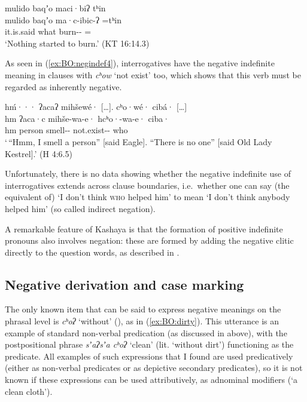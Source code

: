 \documentclass[output=paper,modfonts,nonflat,colorlinks,citecolor=brown]{langscibook}
\begin{document}
{%
\ea 
\label{ex:BO:negindef3}
\glll mulido baqʼo maci·biʔ tʰin\\
    mulido baqʼo ma·c-ibic-ʔ =tʰin\\
    it.is.said what burn-- =\\
\glt `Nothing started to burn.' ({KT 16:14.3})\\
\z
}

As seen in (\ref{ex:BO:negindef4}), interrogatives have the negative indefinite meaning in clauses with \textit{cʰow} `not exist' too, which shows that this verb must be regarded as inherently negative.

\ea 
\label{ex:BO:negindef4}
\glll hḿ··· ʔacaʔ mihšewé· [\ldots]. cʰo·wé· cibá· [\ldots]\\
    hm ʔaca·c mihše-wa-e· {} hcʰo·-wa-e· ciba· {}\\
    hm person smell-- {} not.exist-- who {}\\
\glt `\,``Hmm, I smell a person'' [said Eagle]. ``There is no one'' [said Old Lady Kestrel].' ({H 4:6.5})\\
\z

Unfortunately, there is no data showing whether the negative indefinite use of interrogatives extends across clause boundaries, i.e.\ whether one can say (the equivalent of) `I don't think \textsc{who} helped him' to mean `I don't think anybody helped him' (so called indirect negation).

A remarkable feature of Kashaya is that the formation of positive indefinite pronouns also involves negation: these are formed by adding the negative clitic directly to the question words, as described in .

\subsection{Negative derivation and case marking}
\label{sec:BO:deriv}

The only known item that can be said to express negative meanings on the phrasal level is \textit{cʰoʔ} `without' (), as in (\ref{ex:BO:dirty}). This utterance is an example of standard non-verbal predication (as discussed in  above), with the postpositional phrase \textit{sʼaʔsʼa cʰoʔ} `clean' (lit. `without dirt') functioning as the predicate. All examples of such expressions that I found are used predicatively (either as non-verbal predicates or as depictive secondary predicates), so it is not known if these expressions can be used attributively, as adnominal modifiers (`a clean cloth').
\end{document}
